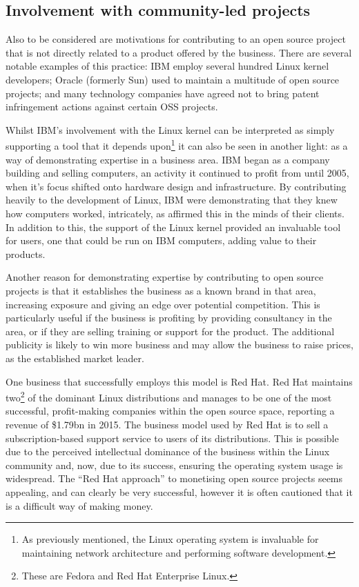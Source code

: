 \documentclass[a4paper]{article}
\begin{document}
\subsection{Involvement with community-led projects}

Also to be considered are motivations for contributing to an open source project that is not directly related to a product offered by the business. There are several notable examples of this practice: IBM employ several hundred Linux kernel developers\cite{ibmlinux}; Oracle (formerly Sun) used to maintain a multitude of open source projects\cite{howopen}; and many technology companies have agreed not to bring patent infringement actions against certain OSS projects\cite{kempcurrentdev}.

Whilst IBM’s involvement with the Linux kernel can be interpreted as simply supporting a tool that it depends upon\footnote{As previously mentioned, the Linux operating system is invaluable for maintaining network architecture and performing software development.} it can also be seen in another light: as a way of demonstrating expertise in a business area. IBM began as a company building and selling computers, an activity it continued to profit from until 2005\cite{ibmlinux}, when it’s focus shifted onto hardware design and infrastructure\cite{lufthansa}. By contributing heavily to the development of Linux, IBM were demonstrating that they knew how computers worked, intricately, as affirmed this in the minds of their clients. In addition to this, the support of the Linux kernel provided an invaluable tool for users, one that could be run on IBM computers, adding value to their products.

Another reason for demonstrating expertise by contributing to open source projects is that it establishes the business as a known brand in that area, increasing exposure and giving an edge over potential competition. This is particularly useful if the business is profiting by providing consultancy in the area, or if they are selling training or support for the product. The additional publicity is likely to win more business and may allow the business to raise prices, as the established market leader.

One business that successfully employs this model is Red Hat\cite{redhat}. Red Hat maintains two\footnote{These are Fedora and Red Hat Enterprise Linux.} of the dominant Linux distributions\cite{distros} and manages to be one of the most successful, profit-making companies within the open source space, reporting a revenue of \$1.79bn in 2015\cite{redhatmoney}. The business model used by Red Hat is to sell a subscription-based support service to users of its distributions. This is possible due to the perceived intellectual dominance of the business within the Linux community and, now, due to its success, ensuring the operating system usage is widespread. The “Red Hat approach” to monetising open source projects seems appealing, and can clearly be very successful, however it is often cautioned that it is a difficult way of making money\cite{dontredhat}.
\end{document}
